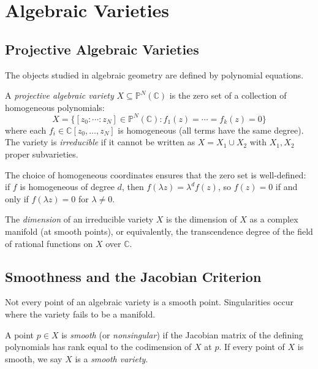 \section{Algebraic Varieties}

\subsection{Projective Algebraic Varieties}

The objects studied in algebraic geometry are defined by polynomial equations.

\begin{definition}
A \emph{projective algebraic variety} $X \subseteq \mathbb{P}^N(\mathbb{C})$ is the zero set of a collection of homogeneous polynomials:
\[
X = \{[z_0 : \cdots : z_N] \in \mathbb{P}^N(\mathbb{C}) : f_1(z) = \cdots = f_k(z) = 0\}
\]
where each $f_i \in \mathbb{C}[z_0, \ldots, z_N]$ is homogeneous (all terms have the same degree). The variety is \emph{irreducible} if it cannot be written as $X = X_1 \cup X_2$ with $X_1, X_2$ proper subvarieties.
\end{definition}

The choice of homogeneous coordinates ensures that the zero set is well-defined: if $f$ is homogeneous of degree $d$, then $f(\lambda z) = \lambda^d f(z)$, so $f(z) = 0$ if and only if $f(\lambda z) = 0$ for $\lambda \neq 0$.

\begin{definition}
The \emph{dimension} of an irreducible variety $X$ is the dimension of $X$ as a complex manifold (at smooth points), or equivalently, the transcendence degree of the field of rational functions on $X$ over $\mathbb{C}$.
\end{definition}

\subsection{Smoothness and the Jacobian Criterion}

Not every point of an algebraic variety is a smooth point. Singularities occur where the variety fails to be a manifold.

\begin{definition}
A point $p \in X$ is \emph{smooth} (or \emph{nonsingular}) if the Jacobian matrix of the defining polynomials has rank equal to the codimension of $X$ at $p$. If every point of $X$ is smooth, we say $X$ is a \emph{smooth variety}.
\end{definition}

